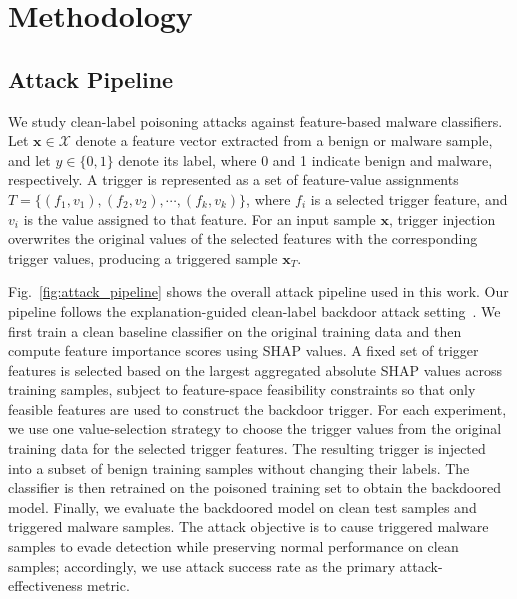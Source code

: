 \section{Methodology}
\subsection{Attack Pipeline}
We study clean-label poisoning attacks against feature-based malware classifiers.
Let $\boldsymbol{x} \in \mathcal{X}$ denote a feature vector extracted from a benign or malware sample, and let $y \in \{0, 1\}$ denote its label, where 0 and 1 indicate benign and malware, respectively.
A trigger is represented as a set of feature-value assignments $T = \{(f_{1}, v_{1}), (f_{2}, v_{2}), \cdots, (f_{k}, v_{k})\}$, where $f_{i}$ is a selected trigger feature, and $v_{i}$ is the value assigned to that feature.
For an input sample $\boldsymbol{x}$, trigger injection overwrites the original values of the selected features with the corresponding trigger values, producing a triggered sample $\boldsymbol{x}_{T}$.



Fig.~\ref{fig:attack_pipeline} shows the overall attack pipeline used in this work.
Our pipeline follows the explanation-guided clean-label backdoor attack setting~\cite{severi}.
We first train a clean baseline classifier on the original training data and then compute feature importance scores using SHAP values.
A fixed set of trigger features is selected based on the largest aggregated absolute SHAP values across training samples, subject to feature-space feasibility constraints so that only feasible features are used to construct the backdoor trigger.
For each experiment, we use one value-selection strategy to choose the trigger values from the original training data for the selected trigger features. 
The resulting trigger is injected into a subset of benign training samples without changing their labels.
The classifier is then retrained on the poisoned training set to obtain the backdoored model.
Finally, we evaluate the backdoored model on clean test samples and triggered malware samples.
The attack objective is to cause triggered malware samples to evade detection while preserving normal performance on clean samples; accordingly, we use attack success rate as the primary attack-effectiveness metric.

